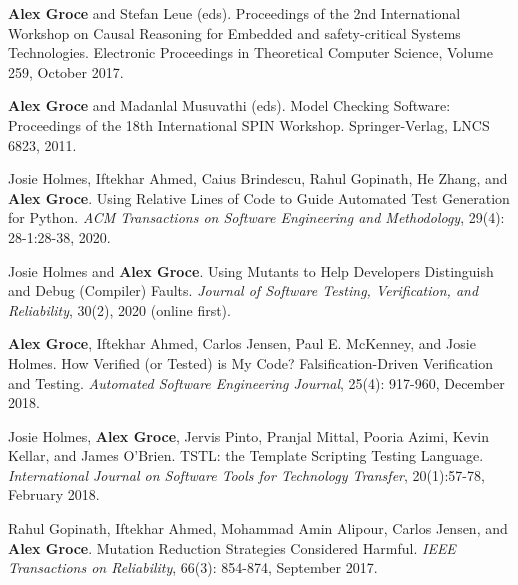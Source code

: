 \documentclass[ComputerScience]{vita}
\begin{document}
\begin{vita}
\begin{Books, Edited Volumes}

\item
{\bf Alex Groce} and Stefan Leue (eds).
\newblock Proceedings of the 2nd International Workshop on 
Causal Reasoning for Embedded and safety-critical Systems Technologies.
\newblock Electronic Proceedings in Theoretical Computer Science, Volume 259, October 2017.

\item
{\bf Alex Groce} and Madanlal Musuvathi (eds).
\newblock Model Checking Software: Proceedings of the 18th International SPIN Workshop.
\newblock Springer-Verlag, LNCS 6823, 2011. 

\end{Books, Edited Volumes}

\begin{Refereed Journal Publications}
\item
Josie Holmes, Iftekhar Ahmed, Caius Brindescu, Rahul Gopinath, He
Zhang, and {\bf Alex Groce}.
\newblock Using Relative Lines of Code to Guide Automated Test
Generation for Python.
\newblock \emph{ACM Transactions on Software Engineering and
  Methodology}, 29(4): 28-1:28-38, 2020.
  
\item
Josie Holmes and {\bf Alex Groce}.
\newblock Using Mutants to Help Developers Distinguish and Debug (Compiler) Faults.
\newblock \emph{Journal of Software Testing, Verification, and
  Reliability}, 30(2), 2020 (online first).

\item
{\bf Alex Groce}, Iftekhar Ahmed, Carlos Jensen, Paul E. McKenney, and
Josie Holmes.
\newblock How Verified (or Tested) is My Code? Falsification-Driven Verification and Testing.
\newblock \emph{Automated Software Engineering Journal}, 25(4):
917-960, December 2018.

\item
Josie Holmes, {\bf Alex Groce}, Jervis Pinto, Pranjal Mittal, Pooria Azimi, Kevin Kellar, and James O'Brien.
\newblock TSTL: the Template Scripting Testing Language.
\newblock \emph{International Journal on Software Tools for Technology Transfer}, 20(1):57-78, February 2018.


\item
Rahul Gopinath, Iftekhar Ahmed, Mohammad Amin Alipour, Carlos Jensen, and {\bf Alex Groce}.
\newblock Mutation Reduction Strategies Considered Harmful.
\newblock \emph{IEEE Transactions on Reliability}, 66(3): 854-874, September 2017.



\end{Refereed Journal Publications}
\end{vita}
\end{document}
